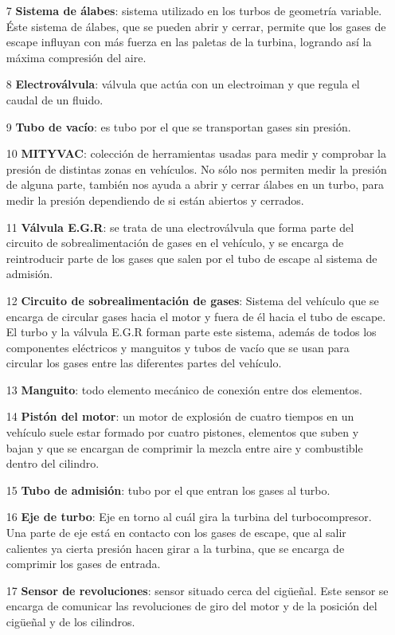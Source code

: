 \documentclass[a4paper,12pt]{article}
\begin{document}
\begin{itemize}
\item[7] \textbf{Sistema de álabes}: sistema utilizado en los turbos de geometría variable. Éste sistema de álabes, que se pueden abrir y cerrar, permite que los gases de escape influyan con más fuerza en las paletas de la turbina, logrando así la máxima compresión del aire.
\item[8] \textbf{Electroválvula}: válvula que actúa con un electroiman y que regula el caudal de un fluido.
\item[9] \textbf{Tubo de vacío}: es tubo por el que se transportan gases sin presión.
\item[10] \textbf{MITYVAC}: colección de herramientas usadas para medir y comprobar la presión de distintas zonas en vehículos. No sólo nos permiten medir la presión de alguna parte, también nos ayuda a abrir y cerrar álabes en un turbo, para medir la presión dependiendo de si están abiertos y cerrados.
\item[11] \textbf{Válvula E.G.R}: se trata de una electroválvula que forma parte del circuito de sobrealimentación de gases en el vehículo, y se encarga de reintroducir parte de los gases que salen por el tubo de escape al sistema de admisión. 
\item[12] \textbf{Circuito de sobrealimentación de gases}: Sistema del vehículo que se encarga de circular gases hacia el motor y fuera de él hacia el tubo de escape. El turbo y la válvula E.G.R forman parte este sistema, además de todos los componentes eléctricos y manguitos y tubos de vacío que se usan para circular los gases entre las diferentes partes del vehículo.
\item[13] \textbf{Manguito}: todo elemento mecánico de conexión entre dos elementos.
\item[14] \textbf{Pistón del motor}: un motor de explosión de cuatro tiempos en un vehículo suele estar formado por cuatro pistones, elementos que suben y bajan y que se encargan de comprimir la mezcla entre aire y combustible dentro del cilindro.
\item[15] \textbf{Tubo de admisión}: tubo por el que entran los gases al turbo.
\item[16] \textbf{Eje de turbo}: Eje en torno al cuál gira la turbina del turbocompresor. Una parte de eje está en contacto con los gases de escape, que al salir calientes ya cierta presión hacen girar a la turbina, que se encarga de comprimir los gases de entrada.
\item[17] \textbf{Sensor de revoluciones}: sensor situado cerca del cig\"ue\~nal. Este sensor se encarga de comunicar las revoluciones de giro del motor y de la posición del cig\"ue\~nal y de los cilindros.

\end{itemize}
\end{document}
